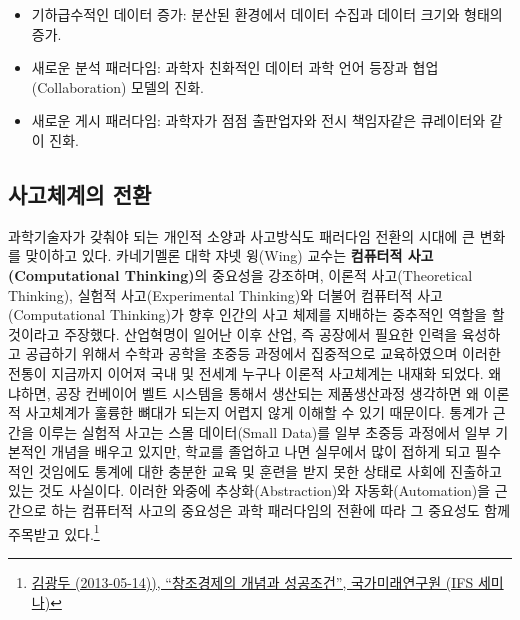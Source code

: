 \documentclass[smallextended]{svjour3}       %
\providecommand{\tightlist}{%
  \setlength{\itemsep}{0pt}\setlength{\parskip}{0pt}}
\begin{document}
\begin{itemize}
\tightlist
\item
  기하급수적인 데이터 증가: 분산된 환경에서 데이터 수집과 데이터 크기와
  형태의 증가.
\item
  새로운 분석 패러다임: 과학자 친화적인 데이터 과학 언어 등장과
  협업(Collaboration) 모델의 진화.
\item
  새로운 게시 패러다임: 과학자가 점점 출판업자와 전시 책임자같은
  큐레이터와 같이 진화.
\end{itemize}

\hypertarget{uxc0acuxace0uxccb4uxacc4uxc758-uxc804uxd658}{%
\subsection{사고체계의
전환}\label{uxc0acuxace0uxccb4uxacc4uxc758-uxc804uxd658}}

과학기술자가 갖춰야 되는 개인적 소양과 사고방식도 패러다임 전환의 시대에
큰 변화를 맞이하고 있다. 카네기멜론 대학 쟈넷 윙(Wing)
교수\cite{wing2006computational}는 \textbf{컴퓨터적 사고(Computational
Thinking)}의 중요성을 강조하며, 이론적 사고(Theoretical Thinking),
실험적 사고(Experimental Thinking)와 더불어 컴퓨터적 사고(Computational
Thinking)가 향후 인간의 사고 체제를 지배하는 중추적인 역할을 할 것이라고
주장했다. 산업혁명이 일어난 이후 산업, 즉 공장에서 필요한 인력을
육성하고 공급하기 위해서 수학과 공학을 초중등 과정에서 집중적으로
교육하였으며 이러한 전통이 지금까지 이어져 국내 및 전세계 누구나 이론적
사고체계는 내재화 되었다. 왜냐하면, 공장 컨베이어 벨트 시스템을 통해서
생산되는 제품생산과정 생각하면 왜 이론적 사고체계가 훌륭한 뼈대가 되는지
어렵지 않게 이해할 수 있기 때문이다. 통계가 근간을 이루는 실험적 사고는
스몰 데이터(Small Data)를 일부 초중등 과정에서 일부 기본적인 개념을
배우고 있지만, 학교를 졸업하고 나면 실무에서 많이 접하게 되고 필수적인
것임에도 통계에 대한 충분한 교육 및 훈련을 받지 못한 상태로 사회에
진출하고 있는 것도 사실이다. 이러한 와중에 추상화(Abstraction)와
자동화(Automation)을 근간으로 하는 컴퓨터적 사고의 중요성은 과학
패러다임의 전환에 따라 그 중요성도 함께 주목받고 있다.\footnote{\href{https://www.youtube.com/watch?v=ZaEihnQwR9s}{김광두
  (2013-05-14)), ``창조경제의 개념과 성공조건'', 국가미래연구원 (IFS
  세미나)}}
\end{document}
